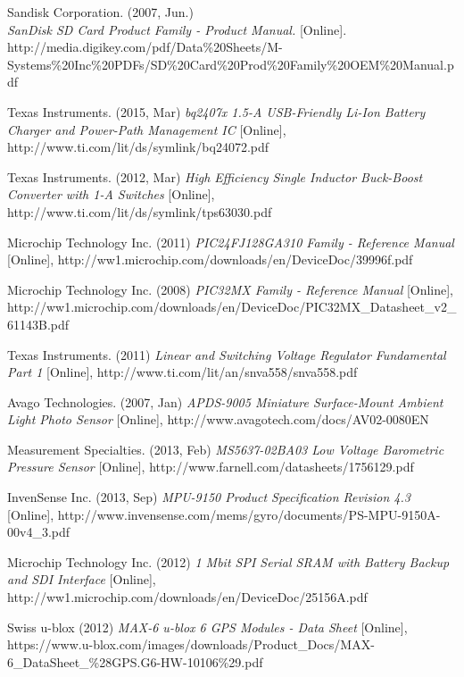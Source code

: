 \documentclass[12pt,openany,a4paper]{book}
\begin{document}
\begin{thebibliography}{99}
	Sandisk Corporation. (2007, Jun.) \\
	\emph{SanDisk SD Card Product Family - Product Manual.} [Online].\\ http://media.digikey.com/pdf/Data\%20Sheets/M-Systems\%20Inc\%20PDFs/SD\%20Card\%20Prod\%20Family\%20OEM\%20Manual.pdf
	
	Texas Instruments. (2015, Mar) \emph{bq2407x 1.5-A USB-Friendly Li-Ion Battery Charger and Power-Path Management IC} [Online],
	http://www.ti.com/lit/ds/symlink/bq24072.pdf
	
	Texas Instruments. (2012, Mar) 
	\emph{High Efficiency Single Inductor Buck-Boost Converter with 1-A Switches} [Online],
	http://www.ti.com/lit/ds/symlink/tps63030.pdf
	
	Microchip Technology Inc. (2011) 
	\emph{PIC24FJ128GA310 Family - Reference Manual} [Online],
	http://ww1.microchip.com/downloads/en/DeviceDoc/39996f.pdf
	
	Microchip Technology Inc. (2008)
	\emph{PIC32MX Family - Reference Manual} [Online], http://ww1.microchip.com/downloads/en/DeviceDoc/PIC32MX\_Datasheet\_v2\_61143B.pdf
	
	Texas Instruments. (2011)
	\emph{Linear and Switching Voltage Regulator Fundamental Part 1} [Online], http://www.ti.com/lit/an/snva558/snva558.pdf
	
	Avago Technologies. (2007, Jan) 
	\emph{APDS-9005 Miniature Surface-Mount Ambient Light Photo Sensor} [Online],
	http://www.avagotech.com/docs/AV02-0080EN
	
	Measurement Specialties. (2013, Feb)
	\emph{MS5637-02BA03 Low Voltage Barometric Pressure Sensor}
	[Online],
	http://www.farnell.com/datasheets/1756129.pdf
	
	InvenSense Inc. (2013, Sep)
	\emph{MPU-9150 Product Specification Revision 4.3} [Online],
	http://www.invensense.com/mems/gyro/documents/PS-MPU-9150A-00v4\_3.pdf
	
	Microchip Technology Inc. (2012)
	\emph{1 Mbit SPI Serial SRAM with Battery Backup and SDI Interface} [Online],
	http://ww1.microchip.com/downloads/en/DeviceDoc/25156A.pdf
	
	Swiss u-blox (2012)
	\emph{MAX-6 u-blox 6 GPS Modules - Data Sheet} [Online],
	https://www.u-blox.com/images/downloads/Product\_Docs/MAX-6\_DataSheet\_\%28GPS.G6-HW-10106\%29.pdf
	

\end{thebibliography}
\end{document}
